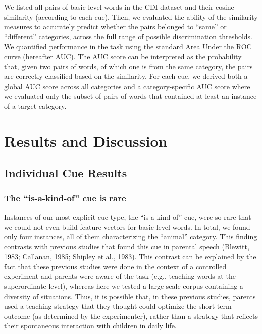 \documentclass[english,,man,floatsintext]{apa6}
\begin{document}
We listed all pairs of basic-level words in the CDI dataset and their cosine similarity (according to each cue).
Then, we evaluated the ability of the similarity measures to accurately
predict whether the pairs belonged to \enquote{same} or \enquote{different}
categories, across the full range of possible discrimination thresholds.
We quantified performance in the task using the standard Area Under the ROC curve (hereafter AUC).
The AUC score can be interpreted as the probability that, given two pairs of words, of which one is from the
same category, the pairs are correctly classified based on the
similarity. For each cue, we derived both a global AUC score across all
categories and a category-specific AUC score where we evaluated only the
subset of pairs of words that contained at least an instance of a target
category.

\hypertarget{results-and-discussion}{%
\section{Results and Discussion}\label{results-and-discussion}}

\hypertarget{individual-cue-results}{%
\subsection{Individual Cue Results}\label{individual-cue-results}}

\hypertarget{the-is-a-kind-of-cue-is-rare}{%
\subsubsection{\texorpdfstring{The \enquote{is-a-kind-of} cue is rare}{The ``is-a-kind-of'' cue is rare}}\label{the-is-a-kind-of-cue-is-rare}}

Instances of our most explicit cue type, the \enquote{is-a-kind-of} cue, were so rare that we could not even build feature vectors for basic-level words. In total, we found only four instances, all of them characterizing the \enquote{animal} category.
This finding contrasts with previous studies that found this cue in parental
speech (Blewitt, 1983; Callanan, 1985; Shipley et al., 1983).
This contrast can be explained by the fact that these previous
studies were done in the context of a controlled experiment and parents
were aware of the task (e.g., teaching words at the superordinate
level), whereas here we tested a large-scale corpus containing a
diversity of situations. Thus, it is possible that, in these previous
studies, parents used a teaching strategy that they thought could
optimize the short-term outcome (as determined by the experimenter),
rather than a strategy that reflects their spontaneous interaction with
children in daily life.
\end{document}
